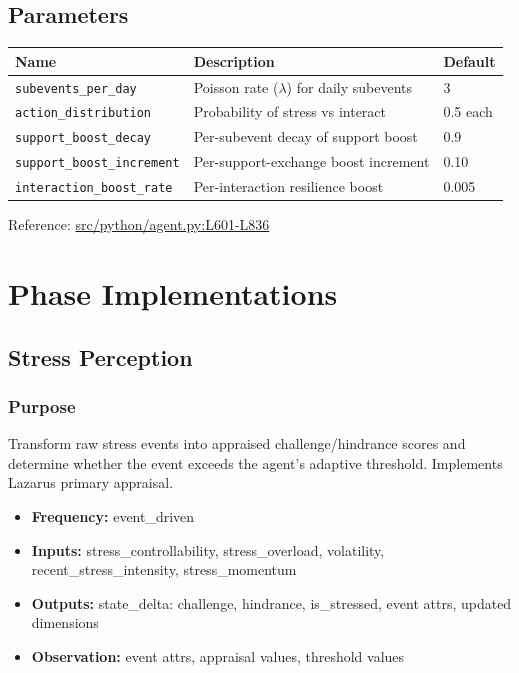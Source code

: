 \documentclass[
  letterpaper,
  DIV=11,
  numbers=noendperiod]{scrartcl}
\providecommand{\tightlist}{%
  \setlength{\itemsep}{0pt}\setlength{\parskip}{0pt}}
\newcommand{\trow}[3]{%
  \texttt{\allowbreak #1} & #2 & #3 \\
}
\begin{document}
\subsection{Parameters}\label{parameters}

\begin{tabularx}{\textwidth}{p{4.5cm}Xp{2cm}}
\toprule
\textbf{Name} & \textbf{Description} & \textbf{Default} \\
\midrule
\trow{subevents\_per\_day}{Poisson rate (\(\lambda\)) for daily subevents}{3}
\trow{action\_distribution}{Probability of stress vs interact}{0.5 each}
\trow{support\_boost\_decay}{Per-subevent decay of support boost}{0.9}
\trow{support\_boost\_increment}{Per-support-exchange boost increment}{0.10}
\trow{interaction\_boost\_rate}{Per-interaction resilience boost}{0.005}
\bottomrule
\end{tabularx}

Reference:
\href{https://github.com/namakala/abm-simulation/blob/84ff9b37fb0c569bef9f122e789d9c23a89348ec/src/python/agent.py\#L601-L836}{src/python/agent.py:L601-L836}

\section{Phase Implementations}\label{phase-implementations}

\subsection{Stress Perception}\label{stress-perception}

\subsubsection{Purpose}\label{purpose-3}

Transform raw stress events into appraised challenge/hindrance scores
and determine whether the event exceeds the agent's adaptive threshold.
Implements Lazarus primary appraisal.

\begin{itemize}
\tightlist
\item
  \textbf{Frequency:} event\_driven
\item
  \textbf{Inputs:} stress\_controllability, stress\_overload,
  volatility, recent\_stress\_intensity, stress\_momentum
\item
  \textbf{Outputs:} state\_delta: challenge, hindrance, is\_stressed,
  event attrs, updated dimensions
\item
  \textbf{Observation:} event attrs, appraisal values, threshold values
\end{itemize}
\end{document}
